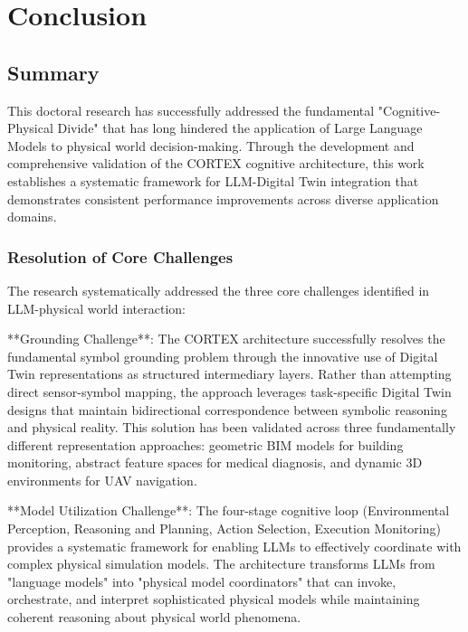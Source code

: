 
\chapter{Conclusion} \label{chp:conclusion}


\section{Summary}

This doctoral research has successfully addressed the fundamental "Cognitive-Physical Divide" that has long hindered the application of Large Language Models to physical world decision-making. Through the development and comprehensive validation of the CORTEX cognitive architecture, this work establishes a systematic framework for LLM-Digital Twin integration that demonstrates consistent performance improvements across diverse application domains.

\subsection{Resolution of Core Challenges}

The research systematically addressed the three core challenges identified in LLM-physical world interaction:

**Grounding Challenge**: The CORTEX architecture successfully resolves the fundamental symbol grounding problem through the innovative use of Digital Twin representations as structured intermediary layers. Rather than attempting direct sensor-symbol mapping, the approach leverages task-specific Digital Twin designs that maintain bidirectional correspondence between symbolic reasoning and physical reality. This solution has been validated across three fundamentally different representation approaches: geometric BIM models for building monitoring, abstract feature spaces for medical diagnosis, and dynamic 3D environments for UAV navigation.

**Model Utilization Challenge**: The four-stage cognitive loop (Environmental Perception, Reasoning and Planning, Action Selection, Execution Monitoring) provides a systematic framework for enabling LLMs to effectively coordinate with complex physical simulation models. The architecture transforms LLMs from "language models" into "physical model coordinators" that can invoke, orchestrate, and interpret sophisticated physical models while maintaining coherent reasoning about physical world phenomena.

